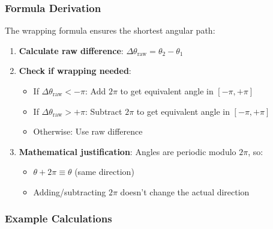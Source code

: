 \documentclass[
  11pt,
]{article}
\providecommand{\tightlist}{%
  \setlength{\itemsep}{0pt}\setlength{\parskip}{0pt}}\usepackage{longtable,booktabs,array}
\begin{document}
\hypertarget{formula-derivation-2}{%
\subsubsection{Formula Derivation}\label{formula-derivation-2}}

The wrapping formula ensures the shortest angular path:

\begin{enumerate}
\def\labelenumi{\arabic{enumi}.}
\item
  \textbf{Calculate raw difference}:
  \(\Delta\theta_{\text{raw}} = \theta_2 - \theta_1\)
\item
  \textbf{Check if wrapping needed}:

  \begin{itemize}
  \tightlist
  \item
    If \(\Delta\theta_{\text{raw}} < -\pi\): Add \(2\pi\) to get
    equivalent angle in \([-\pi, +\pi]\)
  \item
    If \(\Delta\theta_{\text{raw}} > +\pi\): Subtract \(2\pi\) to get
    equivalent angle in \([-\pi, +\pi]\)
  \item
    Otherwise: Use raw difference
  \end{itemize}
\item
  \textbf{Mathematical justification}: Angles are periodic modulo
  \(2\pi\), so:

  \begin{itemize}
  \tightlist
  \item
    \(\theta + 2\pi \equiv \theta\) (same direction)
  \item
    Adding/subtracting \(2\pi\) doesn't change the actual direction
  \end{itemize}
\end{enumerate}

\hypertarget{example-calculations}{%
\subsubsection{Example Calculations}\label{example-calculations}}
\end{document}
